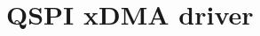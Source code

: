 \hypertarget{group__qspi__dma__module}{}\section{Q\+S\+PI x\+D\+MA driver}
\label{group__qspi__dma__module}
